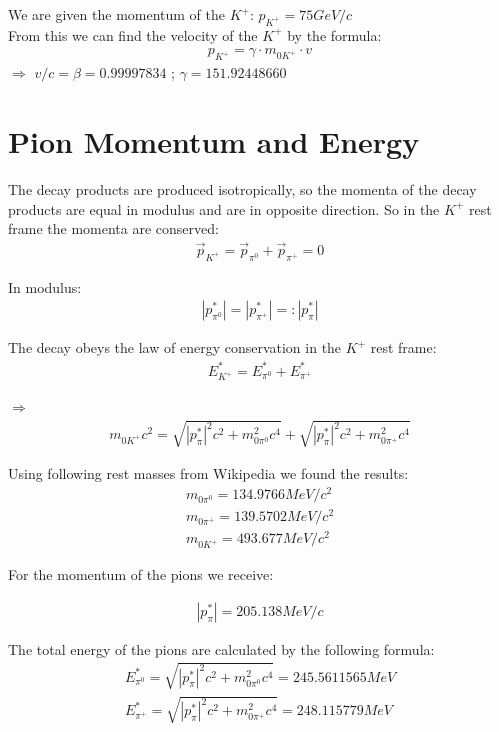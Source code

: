 \documentclass[a4paper,parskip,11pt, DIV12]{scrreprt}
\begin{document}
We are given the momentum of the $K^+$: $p_{K^+} = 75 GeV/c$\\
From this we can find the velocity of the $K^+$ by the formula:
\begin{align*}
p_{K^+} = \gamma \cdot m_{0K^+} \cdot v
\end{align*}
$\Rightarrow$
$v/c = \beta = 0.99997834$ ;
$\gamma = 151.92448660$\\

\section{Pion Momentum and Energy} \label{sec:pE}

The decay products are produced isotropically, so the momenta of the decay products are equal in modulus and are in opposite direction. 
So in the $K^+$ rest frame the momenta are conserved:
\begin{align*}
\overrightarrow{p}_{K^+} = \overrightarrow{p}_{\pi^0} + \overrightarrow{p}_{\pi^+} = 0
\end{align*}

In modulus:
\begin{align*}
|p^*_{\pi^0}| = |p^*_{\pi^+}| =: |p^*_{\pi}|
\end{align*}

The decay obeys the law of energy conservation in the $K^+$ rest frame:
\begin{align*}
E^*_{K^+} = E^*_{\pi^0} + E^*_{\pi^+}
\end{align*}

$\Rightarrow$
\begin{align*}
m_{0K^+}c^2 = \sqrt{|p^*_{\pi}|^2c^2 + m_{0\pi^0}^2c^4} + \sqrt{|p^*_{\pi}|^2c^2 + m_{0\pi^+}^2c^4}
\end{align*}

Using following rest masses from Wikipedia we found the results:
\begin{align*}
m_{0\pi^0} = 134.9766 MeV/c^2\\
m_{0\pi^+} = 139.5702 MeV/c^2\\
m_{0K^+} = 493.677 MeV/c^2
\end{align*}

For the momentum of the pions we receive:

\begin{align*}
|p^*_{\pi}| = 205.138 MeV/c
\end{align*}

The total energy of the pions are calculated by the following formula:
\begin{align*}
E_{\pi^0}^* = \sqrt{|p^*_{\pi}|^2c^2 + m_{0\pi^0}^2c^4} = 245.5611565 MeV\\
E_{\pi^+}^* = \sqrt{|p^*_{\pi}|^2c^2 + m_{0\pi^+}^2c^4}= 248.115779 MeV
\end{align*}


\clearpage  

\end{document}
